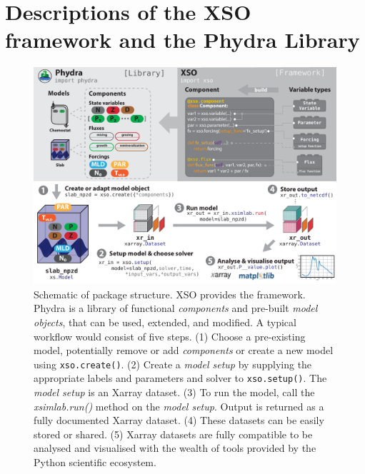 \documentclass[journal abbreviation, manuscript]{copernicus}
\begin{document}
\section{Descriptions of the XSO framework and the Phydra Library} \label{Section:phydrapackage}
%
\begin{figure}[t]
\includegraphics[width=12cm]{Figures/firstdraft_schematics/00_schematics_Package.pdf}
\caption{Schematic of package structure. XSO provides the framework. Phydra is a library of functional \textit{components} and pre-built \textit{model objects}, that can be used, extended, and modified. A typical workflow would consist of five steps. (1) Choose a pre-existing model, potentially remove or add \textit{components} or create a new model using \texttt{xso.create()}. (2) Create a \textit{model setup} by supplying the appropriate labels and parameters and solver to \texttt{xso.setup()}. The \textit{model setup} is an Xarray dataset. (3) To run the model, call the \textit{xsimlab.run()} method on the \textit{model setup}. Output is returned as a fully documented Xarray dataset. (4) These datasets can be easily stored or shared. (5) Xarray datasets are fully compatible to be analysed and visualised with the wealth of tools provided by the Python scientific ecosystem.}
\label{Figure:PhydraXSOPackageSchematics}
\end{figure}

\end{document}
